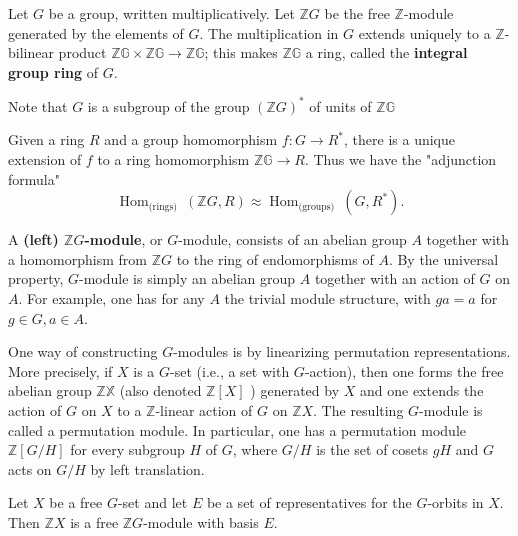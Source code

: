 Let $G$ be a group, written multiplicatively. Let $\mathbb{Z} G$ be the free $\mathbb{Z}$-module generated by the elements of $G$. The multiplication in $G$ extends uniquely to a $\mathbb{Z}$-bilinear product $\mathbb{Z G} \times \mathbb{Z G} \rightarrow \mathbb{Z G}$; this makes $\mathbb{Z G}$ a ring, called the \textbf{integral group ring} of $G$.

Note that $G$ is a subgroup of the group $(\mathbb{Z} G)^*$ of units of $\mathbb{Z G}$ 
\begin{theo}
Given a ring $R$ and a group homomorphism $f: G \rightarrow R^*$, there is a unique extension of $f$ to a ring homomorphism $\mathbb{Z G} \rightarrow R$. Thus we have the "adjunction formula"
    $$
    \operatorname{Hom}_{\text {(rings) }}(\mathbb{Z} G, R) \approx \operatorname{Hom}_{\text {(groups) }}\left(G, R^*\right) .
    $$
\end{theo}

A \textbf{(left) $\mathbb{Z} G$-module}, or $G$-module, consists of an abelian group $A$ together with a homomorphism from $\mathbb{Z} G$ to the ring of endomorphisms of $A$. By the universal property, $G$-module is simply an abelian group $A$ together with an action of $G$ on $A$. For example, one has for any $A$ the trivial module structure, with $g a=a$ for $g \in G, a \in A$.

One way of constructing $G$-modules is by linearizing permutation representations. More precisely, if $X$ is a $G$-set (i.e., a set with $G$-action), then one forms the free abelian group $\mathbb{Z X}$ (also denoted $\mathbb{Z}[X]$ ) generated by $X$ and one extends the action of $G$ on $X$ to a $\mathbb{Z}$-linear action of $G$ on $\mathbb{Z} X$. The resulting $G$-module is called a permutation module. In particular, one has a permutation module $\mathbb{Z}[G / H]$ for every subgroup $H$ of $G$, where $G / H$ is the set of cosets $g H$ and $G$ acts on $G / H$ by left translation.

\begin{prop}
Let $X$ be a free $G$-set and let $E$ be a set of representatives for the $G$-orbits in $X$. Then $\mathbb{Z}X$ is a free $\mathbb{Z}G$-module with basis $E$.
\end{prop}


